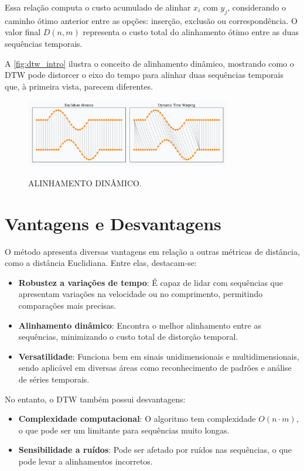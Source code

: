 Essa relação computa o custo acumulado de alinhar \(x_i\) com \(y_j\), considerando o caminho ótimo anterior entre as opções: inserção, exclusão ou correspondência. O valor final \(D(n, m)\) representa o custo total do alinhamento ótimo entre as duas sequências temporais.


A \autoref{fig:dtw_intro} ilustra o conceito de alinhamento dinâmico, mostrando como o DTW pode distorcer o eixo do tempo para alinhar duas sequências temporais que, à primeira vista, parecem diferentes.

\begin{figure}[h!]
    \centering
    \caption{ALINHAMENTO DINÂMICO.}
    \includegraphics[width=0.8\textwidth]{fig/dtw_vs_euc.png}
    \label{fig:dtw_intro}
\end{figure}

\section{Vantagens e Desvantagens}

O método apresenta diversas vantagens em relação a outras métricas de distância, como a distância Euclidiana. Entre elas, destacam-se:
\begin{itemize}
    \item \textbf{Robustez a variações de tempo}: É capaz de lidar com sequências que apresentam variações na velocidade ou no comprimento, permitindo comparações mais precisas.
    \item \textbf{Alinhamento dinâmico}: Encontra o melhor alinhamento entre as sequências, minimizando o custo total de distorção temporal.
    \item \textbf{Versatilidade}: Funciona bem em sinais unidimensionais e multidimensionais, sendo aplicável em diversas áreas como reconhecimento de padrões e análise de séries temporais.
\end{itemize}

No entanto, o DTW também possui desvantagens:
\begin{itemize}
    \item \textbf{Complexidade computacional}: O algoritmo tem complexidade \(O(n \cdot m)\), o que pode ser um limitante para sequências muito longas.
    \item \textbf{Sensibilidade a ruídos}: Pode ser afetado por ruídos nas sequências, o que pode levar a alinhamentos incorretos.
\end{itemize}


